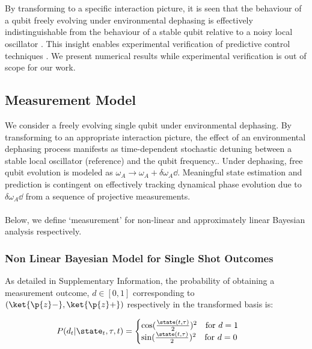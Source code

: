 \\
\\
By transforming to a specific interaction picture, it is seen that the behaviour of a qubit freely evolving under environmental dephasing is effectively indistinguishable from the behaviour of a stable qubit relative to a noisy local oscillator \cite{ball2016, soare2014}. This insight enables experimental verification of predictive control techniques \cite{mavadia2017}. We present numerical results while experimental verification is out of scope for our work.

\subsection{Measurement Model} \label{sec:main:part1}

We consider a freely evolving single qubit under environmental dephasing. By transforming to an appropriate interaction picture, the effect of an environmental dephasing process manifests as time-dependent stochastic detuning between a stable local oscillator (reference) and the qubit frequency.. Under dephasing, free qubit evolution is modeled as $\omega_A \to \omega_A + \delta \omega_A \dd$. Meaningful state estimation and prediction is contingent on effectively tracking dynamical phase evolution due to $ \delta \omega_A \dd$ from a sequence of projective measurements. 
\\
\\
Below, we define `measurement' for non-linear and approximately linear Bayesian analysis respectively.

\subsubsection{Non Linear Bayesian Model for Single Shot Outcomes}

As detailed in Supplementary Information, the probability of obtaining a measurement outcome, $d \in [0,1]$ corresponding to $(\ket{\p{z}-}, \ket{\p{z}+})$ respectively in the transformed basis is:

\begin{align}
P(d_t | \state_t, \tau, t) &= \begin{cases} \cos(\frac{\state(t,\tau)}{2})^2 \quad \text{for $d=1$} \\   \sin(\frac{\state(t,\tau)}{2})^2  \quad \text{for $ d=0$} \end{cases}
\end{align}

